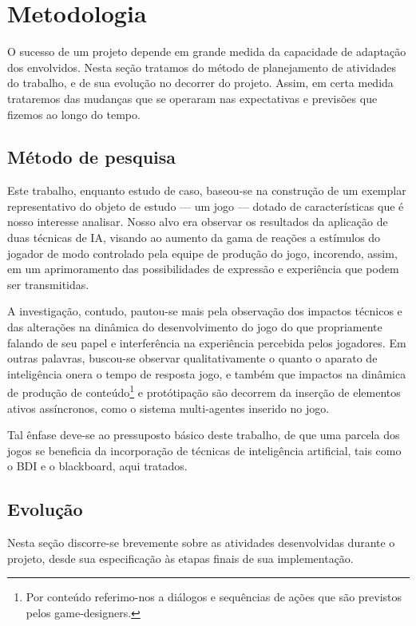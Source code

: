 \chapter{Metodologia}

O sucesso de um projeto depende em grande medida da capacidade de
adaptação dos envolvidos. Nesta seção tratamos do método de
planejamento de atividades do trabalho, e de sua evolução no decorrer
do projeto. Assim, em certa medida trataremos das mudanças que se
operaram nas expectativas e previsões que fizemos ao longo do tempo.

\section{Método de pesquisa}

Este trabalho, enquanto estudo de caso, baseou-se na construção de um
exemplar representativo do objeto de estudo --- um jogo --- dotado de
características que é nosso interesse analisar. Nosso alvo era
observar os resultados da aplicação de duas técnicas de IA, visando ao
aumento da gama de reações a estímulos do jogador de modo controlado
pela equipe de produção do jogo, incorendo, assim, em um aprimoramento
das possibilidades de expressão e experiência que podem ser
transmitidas.

A investigação, contudo, pautou-se mais pela observação dos impactos
técnicos e das alterações na dinâmica do desenvolvimento do jogo do
que propriamente falando de seu papel e interferência na experiência
percebida pelos jogadores. Em outras palavras, buscou-se observar
qualitativamente o quanto o aparato de inteligência onera o tempo de
resposta jogo, e também que impactos na dinâmica de produção de
conteúdo\footnote{Por conteúdo   referimo-nos a diálogos e sequências
  de ações que são previstos   pelos game-designers.} e protótipação
são decorrem da inserção de elementos ativos assíncronos, como o
sistema multi-agentes inserido no jogo.

Tal ênfase deve-se ao pressuposto básico deste trabalho, de que uma
parcela dos jogos se beneficia da incorporação de técnicas de
inteligência artificial, tais como o BDI e o blackboard, aqui tratados.


\section{Evolução}

Nesta seção discorre-se brevemente sobre as atividades desenvolvidas durante o projeto, desde sua especificação às etapas finais de sua implementação.

